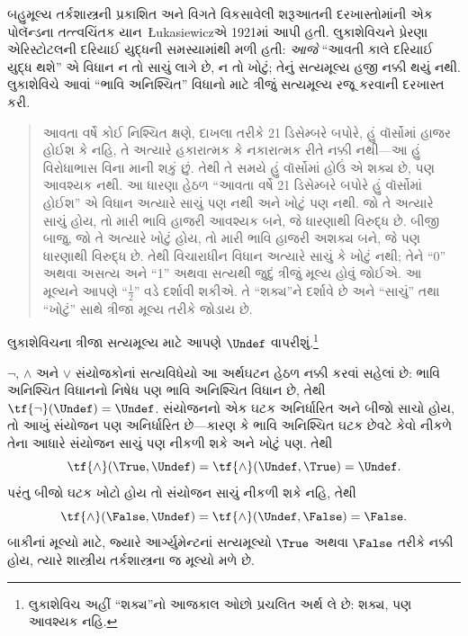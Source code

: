 \documentclass[../../../include/open-logic-section]{subfiles}
\begin{document}


બહુમૂલ્ય તર્કશાસ્ત્રની પ્રકાશિત અને વિગતે વિકસાવેલી શરૂઆતની
દરખાસ્તોમાંની એક પોલૅન્ડના તત્ત્વચિંતક યાન~\L ukasiewiczએ
1921માં આપી હતી. લુકાશેવિચને પ્રેરણા એરિસ્ટોટલની દરિયાઈ યુદ્ધની
સમસ્યામાંથી મળી હતી: \emph{આજે} ``આવતી કાલે દરિયાઈ યુદ્ધ થશે'' એ
વિધાન ન તો સાચું લાગે છે, ન તો ખોટું; તેનું સત્યમૂલ્ય હજી નક્કી થયું
નથી. લુકાશેવિચે આવાં ``ભાવિ અનિશ્ચિત'' વિધાનો માટે ત્રીજું સત્યમૂલ્ય
રજૂ કરવાની દરખાસ્ત કરી.
\begin{quote}
આવતા વર્ષે કોઈ નિશ્ચિત ક્ષણે, દાખલા તરીકે 21 ડિસેમ્બરે બપોરે,
હું વૉર્સોમાં હાજર હોઈશ કે નહિ, તે અત્યારે હકારાત્મક કે નકારાત્મક
રીતે નક્કી નથી—આ હું વિરોધાભાસ વિના માની શકું છું. તેથી તે
સમયે હું વૉર્સોમાં હોઉં એ શક્ય છે, પણ આવશ્યક નથી. આ ધારણા હેઠળ
``આવતા વર્ષે 21 ડિસેમ્બરે બપોરે હું વૉર્સોમાં હોઈશ'' એ વિધાન અત્યારે
સાચું પણ નથી અને ખોટું પણ નથી. જો તે અત્યારે સાચું હોય, તો મારી
ભાવિ હાજરી આવશ્યક બને, જે ધારણાથી વિરુદ્ધ છે. બીજી બાજુ, જો તે
અત્યારે ખોટું હોય, તો મારી ભાવિ હાજરી અશક્ય બને, જે પણ ધારણાથી
વિરુદ્ધ છે. તેથી વિચારાધીન વિધાન અત્યારે સાચું કે ખોટું નથી; તેને
``0'' અથવા અસત્ય અને ``1'' અથવા સત્યથી જુદું ત્રીજું મૂલ્ય હોવું
જોઈએ. આ મૂલ્યને આપણે ``$\frac{1}{2}$'' વડે દર્શાવી શકીએ. તે
``શક્ય''ને દર્શાવે છે અને ``સાચું'' તથા ``ખોટું'' સાથે ત્રીજા મૂલ્ય
તરીકે જોડાય છે.
\end{quote}
લુકાશેવિચના ત્રીજા સત્યમૂલ્ય માટે આપણે $\Undef$ વાપરીશું.\footnote{લુકાશેવિચ
અહીં ``શક્ય''નો આજકાલ ઓછો પ્રચલિત અર્થ લે છે: શક્ય, પણ આવશ્યક નહિ.}

$\lnot$, $\land$ અને $\lor$ સંયોજકોનાં સત્યવિધેયો આ અર્થઘટન હેઠળ
નક્કી કરવાં સહેલાં છે: ભાવિ અનિશ્ચિત વિધાનનો નિષેધ પણ ભાવિ અનિશ્ચિત
વિધાન છે, તેથી $\tf{\lnot}(\Undef) = \Undef$. સંયોજનનો એક ઘટક
અનિર્ધારિત અને બીજો સાચો હોય, તો આખું સંયોજન પણ અનિર્ધારિત છે—કારણ
કે ભાવિ અનિશ્ચિત ઘટક છેવટે કેવો નીકળે તેના આધારે સંયોજન સાચું પણ
નીકળી શકે અને ખોટું પણ. તેથી \[
    \tf{\land}(\True, \Undef) =
\tf{\land}(\Undef, \True) =
\Undef.
\]
પરંતુ બીજો ઘટક ખોટો હોય તો સંયોજન સાચું નીકળી શકે નહિ, તેથી
\[\tf{\land}(\False, \Undef) =
\tf{\land}(\Undef, \False) = \False.\]
બાકીનાં મૂલ્યો માટે, જ્યારે આર્ગ્યુમેન્ટનાં સત્યમૂલ્યો $\True$
અથવા $\False$ તરીકે નક્કી હોય, ત્યારે શાસ્ત્રીય તર્કશાસ્ત્રના
જ મૂલ્યો મળે છે.
\end{document}
